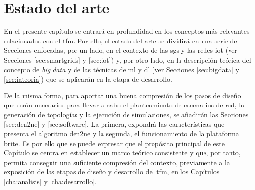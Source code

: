 \chapter{Estado del arte}
\label{estadoArte}

En el presente capítulo se entrará en profundidad en los conceptos más relevantes relacionados con el \gls{tfm}. Por ello, el estado del arte se dividirá en una serie de Secciones enfocadas, por un lado, en el contexto de las \gls{sg}s y las redes \acrshort{iot} (ver Secciones \ref{sec:smartgrids} y \ref{sec:iot}) y, por otro lado, en la descripción teórica del concepto de \textit{big data} y de las técnicas de \gls{ml} y \gls{dl} (ver Secciones \ref{sec:bigdata} y \ref{sec:iateoria}) que se aplicarán en la etapa de desarrollo. 

\vspace{3mm}

De la misma forma, para aportar una buena compresión de los pasos de diseño que serán necesarios para llevar a cabo el planteamiento de escenarios de red, la generación de topologías y la ejecución de simulaciones, se añadirán las Secciones \ref{sec:den2ne} y \ref{sec:software}. La primera, expondrá las características que presenta el algoritmo \acrshort{den2ne} y la segunda, el funcionamiento de la plataforma \acrshort{brite}. Es por ello que se puede expresar que el propósito principal de este Capítulo se centra en establecer un marco teórico consistente y que, por tanto, permita conseguir una suficiente compresión del contexto, previamente a la exposición de las etapas de diseño y desarrollo del \gls{tfm}, en los Capítulos \ref{cha:analisis} y \ref{cha:desarrollo}.

\vspace{3mm}















